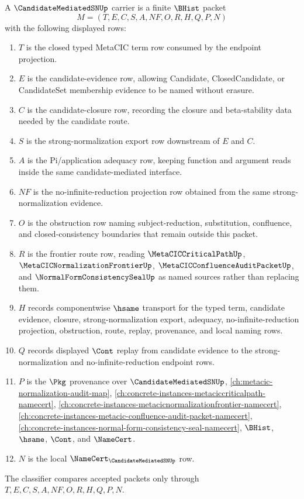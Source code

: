\begin{definition}
\label{def:candidate-mediated-sn-carrier}
A $\CandidateMediatedSNUp$ carrier is a finite $\BHist$ packet
$$
M=(T,E,C,S,A,NF,O,R,H,Q,P,N)
$$
with the following displayed rows:
\begin{enumerate}
\item $T$ is the closed typed MetaCIC term row consumed by the endpoint projection.
\item $E$ is the candidate-evidence row, allowing Candidate, ClosedCandidate, or CandidateSet membership evidence to be named without erasure.
\item $C$ is the candidate-closure row, recording the closure and beta-stability data needed by the candidate route.
\item $S$ is the strong-normalization export row downstream of $E$ and $C$.
\item $A$ is the Pi/application adequacy row, keeping function and argument reads inside the same candidate-mediated interface.
\item $NF$ is the no-infinite-reduction projection row obtained from the same strong-normalization evidence.
\item $O$ is the obstruction row naming subject-reduction, substitution, confluence, and closed-consistency boundaries that remain outside this packet.
\item $R$ is the frontier route row, reading $\MetaCICCriticalPathUp$, $\MetaCICNormalizationFrontierUp$, $\MetaCICConfluenceAuditPacketUp$, and $\NormalFormConsistencySealUp$ as named sources rather than replacing them.
\item $H$ records componentwise $\hsame$ transport for the typed term, candidate evidence, closure, strong-normalization export, adequacy, no-infinite-reduction projection, obstruction, route, replay, provenance, and local naming rows.
\item $Q$ records displayed $\Cont$ replay from candidate evidence to the strong-normalization and no-infinite-reduction endpoint rows.
\item $P$ is the $\Pkg$ provenance over $\CandidateMediatedSNUp$, \autoref{ch:metacic-normalization-audit-map}, \autoref{ch:concrete-instances-metaciccriticalpath-namecert}, \autoref{ch:concrete-instances-metacicnormalizationfrontier-namecert}, \autoref{ch:concrete-instances-metacic-confluence-audit-packet-namecert}, \autoref{ch:concrete-instances-normal-form-consistency-seal-namecert}, $\BHist$, $\hsame$, $\Cont$, and $\NameCert$.
\item $N$ is the local $\NameCert_{\CandidateMediatedSNUp}$ row.
\end{enumerate}
The classifier compares accepted packets only through $T,E,C,S,A,NF,O,R,H,Q,P,N$.
\end{definition}

